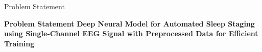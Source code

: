 \begin{frame}{Problem Statement}
	\begin{block}{\centering \textbf{Problem Statement}}
		\centering
		\textbf{Deep Neural Model for Automated Sleep Staging \\
			using Single-Channel EEG Signal with Preprocessed   Data for Efficient Training}
	\end{block}
\end{frame}
